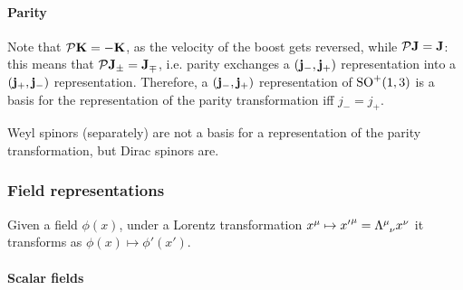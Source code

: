 \paragraph{Parity}

Note that $ \mathcal{P} \mathbf{K} = -\mathbf{K} $, as the velocity of the boost gets reversed, while $ \mathcal{P} \mathbf{J} = \mathbf{J} $: this means that $ \mathcal{P} \mathbf{J}_\pm = \mathbf{J}_\mp $, i.e. parity exchanges a $ \mathbf{\left( j_-,j_+ \right)} $ representation into a $ \mathbf{\left( j_+,j_- \right)} $ representation. Therefore, a $ \mathbf{\left( j_-,j_+ \right)} $ representation of $ \mathrm{SO}^+(1,3) $ is a basis for the representation of the parity transformation iff $ j_- = j_+ $.

\begin{example}{}{}
  Weyl spinors (separately) are not a basis for a representation of the parity transformation, but Dirac spinors are.
\end{example}

\subsubsection{Field representations}

Given a field $ \phi(x) $, under a Lorentz transformation $ x^\mu \mapsto {x'}^\mu = \tensor{\Lambda}{^\mu_\nu} x^\nu $ it transforms as $ \phi(x) \mapsto \phi'(x') $.

\paragraph{Scalar fields}


